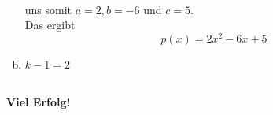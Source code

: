 \documentclass[a4paper,11pt]{scrartcl}
\begin{document}
\begin{enumerate}[a)]
\begin{align*}
\end{align*}
uns somit $a=2,b=-6$ und $c=5$.\\
Das ergibt
$$
p(x)=2x^2-6x+5
$$
\item $k-1=2$
\end{enumerate}
\quad\\

\vfill \hfill \textbf{Viel Erfolg!}
\end{document}
